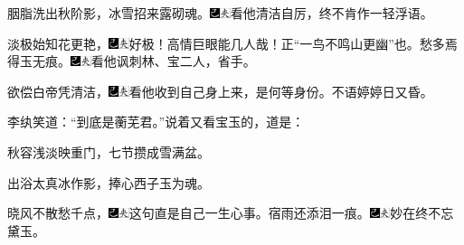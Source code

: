 胭脂洗出秋阶影，冰雪招来露砌魂。{\includegraphics[width=3mm]{../Images/00003}\includegraphics[width=3mm]{../Images/00012}\footnotesize \kaishu 看他清洁自厉，终不肯作一轻浮语。}

淡极始知花更艳，{\includegraphics[width=3mm]{../Images/00003}\includegraphics[width=3mm]{../Images/00012}\footnotesize \kaishu 好极！高情巨眼能几人哉！正``一鸟不鸣山更幽''也。}愁多焉得玉无痕。{\includegraphics[width=3mm]{../Images/00003}\includegraphics[width=3mm]{../Images/00012}\footnotesize \kaishu 看他讽刺林、宝二人，省手。}

欲偿白帝凭清洁，{\includegraphics[width=3mm]{../Images/00003}\includegraphics[width=3mm]{../Images/00012}\footnotesize \kaishu 看他收到自己身上来，是何等身份。}不语婷婷日又昏。

李纨笑道：``到底是蘅芜君。''说着又看宝玉的，道是：

秋容浅淡映重门，七节攒成雪满盆。

出浴太真冰作影，捧心西子玉为魂。

晓风不散愁千点，{\includegraphics[width=3mm]{../Images/00003}\includegraphics[width=3mm]{../Images/00012}\footnotesize \kaishu 这句直是自己一生心事。}宿雨还添泪一痕。{\includegraphics[width=3mm]{../Images/00003}\includegraphics[width=3mm]{../Images/00012}\footnotesize \kaishu 妙在终不忘黛玉。}

